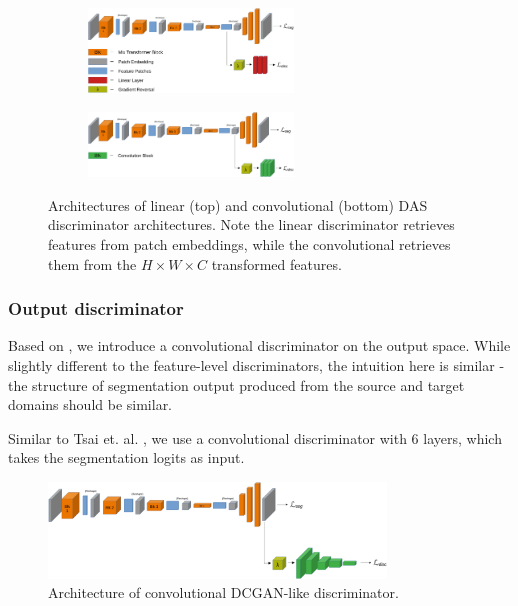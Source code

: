 \documentclass[a4paper,12pt]{report}
\begin{document}
\bigbreak
\begin{figure}[h]
    \centering
    \begin{subfigure}[b]{\textwidth}
        \centering
        \includegraphics[width=0.6\textwidth]{res/discriminator-diagrams/linear.pdf}
        \label{fig:das-discriminators-linear}
    \end{subfigure}
    \begin{subfigure}[b]{\textwidth}
        \centering
        \includegraphics[width=0.6\textwidth]{res/discriminator-diagrams/convolutional.pdf}
        \label{fig:das-discriminators-conv}
    \end{subfigure}
    \caption{Architectures of linear (top) and convolutional (bottom) DAS discriminator architectures. Note the linear discriminator retrieves features from patch embeddings, while the convolutional retrieves them from the $H \times W \times C$ transformed features.}
    \label{fig:das-discriminators}
\end{figure}

\subsubsection{Output discriminator}

Based on \cite{tsai_learning_2020}, we introduce a convolutional discriminator on the output space. While slightly different to the feature-level discriminators, the intuition here is similar - the structure of segmentation output produced from the source and target domains should be similar.

Similar to Tsai et. al. \cite{tsai_learning_2020}, we use a convolutional discriminator with 6 layers, which takes the segmentation logits as input.

\bigbreak
\begin{figure}[h]
    \centering
    \includegraphics[width=0.8\textwidth]{res/discriminator-diagrams/dcgan-output.pdf}
    \caption{Architecture of convolutional DCGAN-like discriminator.}
    \label{fig:das-discriminators-output}
\end{figure}
\end{document}
